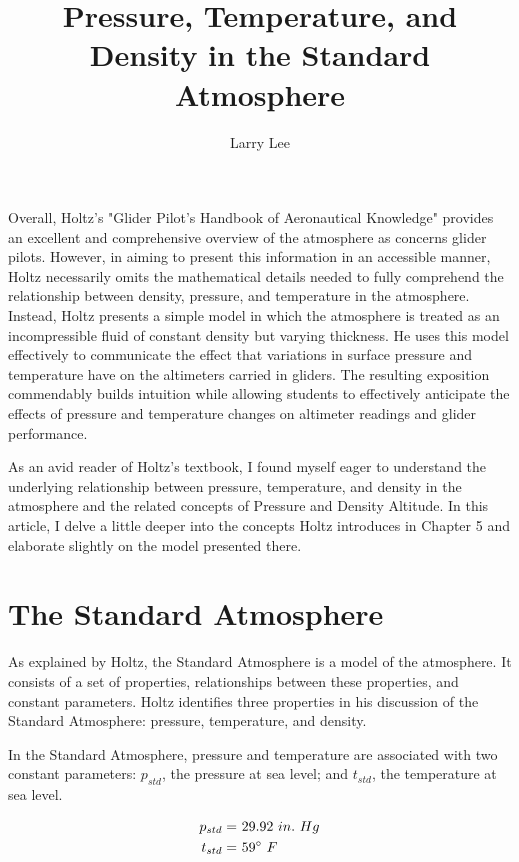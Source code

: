 \documentclass[10pt,a4paper]{article}
\author{Larry Lee}
\title{Pressure, Temperature, and Density in the Standard Atmosphere}
\begin{document}
\maketitle
\begin{abstract}
\end{abstract}
Overall, Holtz's "Glider Pilot's Handbook of Aeronautical Knowledge" provides an excellent and comprehensive overview of the atmosphere as concerns glider pilots. However, in aiming to present this information in an accessible manner, Holtz necessarily omits the mathematical details needed to fully comprehend the relationship between density, pressure, and temperature in the atmosphere. Instead, Holtz presents a simple model in which the atmosphere is treated as an incompressible fluid of constant density but varying thickness. He uses this model effectively to communicate the effect that variations in surface pressure and temperature have on the altimeters carried in gliders. The resulting exposition commendably builds intuition while allowing students to effectively anticipate the effects of pressure and temperature changes on altimeter readings and glider performance.

As an avid reader of Holtz's textbook, I found myself eager to understand the underlying relationship between pressure, temperature, and density in the atmosphere and the related concepts of Pressure and Density Altitude. In this article, I delve a little deeper into the concepts Holtz introduces in Chapter 5 and elaborate slightly on the model presented there.

\section{The Standard Atmosphere}

As explained by Holtz, the Standard Atmosphere is a model of the atmosphere. It consists of a set of properties, relationships between these properties, and constant parameters. Holtz identifies three properties in his discussion of the Standard Atmosphere: pressure, temperature, and density.

In the Standard Atmosphere, pressure and temperature are associated with two constant parameters: $p_{std}$, the pressure at sea level; and $t_{std}$, the temperature at sea level.

\begin{align*}
  p_{std} =&\ 29.92\ in.\ Hg\\
  t_{std} =&\ 59\degree\ F
\end{align*}
\end{document}
